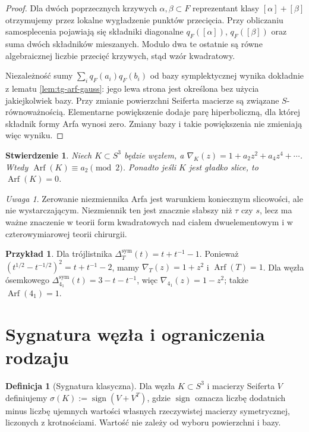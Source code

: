 \documentclass[11pt,a4paper]{report}
\numberwithin{equation}{section}
\theoremstyle{plain}
\newtheorem{stwierdzenie}[twierdzenie]{Stwierdzenie}
\theoremstyle{definition}
\newtheorem{definicja}[twierdzenie]{Definicja}
\newtheorem{przyklad}[twierdzenie]{Przykład}
\theoremstyle{remark}
\newtheorem{uwaga}[twierdzenie]{Uwaga}
\begin{document}
\begin{proof}
Dla dwóch poprzecznych krzywych $\alpha,\beta\subset F$
reprezentant klasy $[\alpha]+[\beta]$ otrzymujemy przez
lokalne wygładzenie punktów przecięcia. Przy obliczaniu
samosplecenia pojawiają się składniki diagonalne
$q_F([\alpha])$, $q_F([\beta])$ oraz suma dwóch składników
mieszanych. Modulo dwa te ostatnie są równe algebraicznej
liczbie przecięć krzywych, stąd wzór kwadratowy.

Niezależność sumy $\sum_iq_F(a_i)q_F(b_i)$ od bazy
symplektycznej wynika dokładnie z lematu
\ref{lem:tg-arf-gauss}: jego lewa strona jest określona
bez użycia jakiejkolwiek bazy.
Przy zmianie powierzchni Seiferta macierze są związane
$S$-równoważnością. Elementarne powiększenie dodaje parę
hiperboliczną, dla której składnik formy Arfa wynosi zero.
Zmiany bazy i takie powiększenia nie zmieniają więc wyniku.
\end{proof}

\begin{stwierdzenie}
Niech $K\subset S^3$ będzie węzłem, a
$\nabla_K(z)=1+a_2z^2+a_4z^4+\cdots$.
Wtedy $\operatorname{Arf}(K)\equiv a_2\pmod2$.
Ponadto jeśli $K$ jest gładko slice, to
$\operatorname{Arf}(K)=0$.
\end{stwierdzenie}

\begin{uwaga}
Zerowanie niezmiennika Arfa jest warunkiem koniecznym
slicowości, ale nie wystarczającym. Niezmiennik ten
jest znacznie słabszy niż $\tau$ czy $s$, lecz
ma ważne znaczenie w teorii form kwadratowych
nad ciałem dwuelementowym i w czterowymiarowej
teorii chirurgii.
\end{uwaga}

\begin{przyklad}
Dla trójlistnika
$\Delta_T^{\mathrm{sym}}(t)=t+t^{-1}-1$.
Ponieważ
$(t^{1/2}-t^{-1/2})^2=t+t^{-1}-2$,
mamy $\nabla_T(z)=1+z^2$ i
$\operatorname{Arf}(T)=1$.
Dla węzła ósemkowego
$\Delta_{4_1}^{\mathrm{sym}}(t)=3-t-t^{-1}$,
więc $\nabla_{4_1}(z)=1-z^2$;
także $\operatorname{Arf}(4_1)=1$.
\end{przyklad}


\section{Sygnatura węzła i ograniczenia rodzaju}
\label{sec:kt-sygnatura}

\begin{definicja}[Sygnatura klasyczna]
Dla węzła $K\subset S^3$ i macierzy Seiferta $V$ definiujemy
$\sigma(K):=\operatorname{sign}(V+V^T)$,
gdzie $\operatorname{sign}$ oznacza liczbę dodatnich minus liczbę
ujemnych wartości własnych rzeczywistej macierzy symetrycznej,
liczonych z krotnościami. Wartość nie zależy od wyboru
powierzchni i bazy.
\end{definicja}
\end{document}
